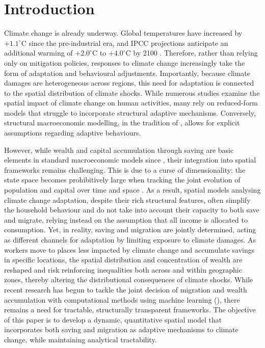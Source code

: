 \documentclass[12pt, a4paper]{article}
\begin{document}
\newpage
\tableofcontents
\newpage

\section{Introduction}

Climate change is already underway. Global temperatures have increased by $+1.1^\circ\text{C}$ since the pre-industrial era, and IPCC projections anticipate an additional warming of $+2.0^\circ\text{C}$ to $+4.0^\circ\text{C}$ by 2100 \citep{lee_ipcc_2023}. Therefore, rather than relying only on mitigation policies, responses to climate change increasingly take the form of adaptation and behavioural adjustments. Importantly, because climate damages are heterogeneous across regions, this need for adaptation is connected to the spatial distribution of climate shocks. While numerous studies examine the spatial impact of climate change on human activities, many rely on reduced-form models \cite[e.g.,][]{burke_global_2015, hsiang_estimating_2017} that struggle to incorporate structural adaptive mechanisms. Conversely, structural macroeconomic modelling, in the tradition of \citet{nordhaus_managing_1994}, allows for explicit assumptions regarding adaptive behaviours. 

However, while wealth and capital accumulation through saving are basic elements in standard macroeconomic models since \citet{solow_contribution_1956}, their integration into spatial frameworks remains challenging. This is due to a curse of dimensionality: the state space becomes prohibitively large when tracking the joint evolution of population and capital over time and space \citep{desmet_spatial_2025}. As a result, spatial models analysing climate change adaptation, despite their rich structural features, often simplify the household behaviour and do not take into account their capacity to both save and migrate, relying instead on the assumption that all income is allocated to consumption. Yet, in reality, saving and migration are jointly determined, acting as different channels for adaptation by limiting exposure to climate damages. As workers move to places less impacted by climate change and accumulate savings in specific locations, the spatial distribution and concentration of wealth are reshaped and risk reinforcing inequalities both across and within geographic zones, thereby altering the distributional consequences of climate shocks. While recent research has begun to tackle the joint decision of migration and wealth accumulation with computational methods using machine learning (\citet{sun_wealth_2025}), there remains a need for tractable, structurally transparent frameworks. The objective of this paper is to develop a dynamic, quantitative spatial model that incorporates both saving and migration as adaptive mechanisms to climate change, while maintaining analytical tractability.
\end{document}
